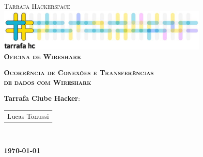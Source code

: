 \begin{titlepage}
\begin{center}

\textsc{\large Tarrafa Hackerspace}\\[1cm]

\includegraphics[width=0.8\textwidth]{../logo}\\[1.5cm]

\textsc{\LARGE \bfseries Oficina de Wireshark\\ [1.3cm]}

\textsc{\LARGE \bfseries Ocorrência de Conexões e Transferências \\ de dados com Wireshark \\ [2cm]}


\begin{Large}
\textbf{Tarrafa Clube Hacker}:
\begin{tabular}{|l}
Lucas Tonussi \\
\end{tabular} \\ [0.5cm]
\end{Large}

\vfill

\textbf{\today}

\end{center}
\end{titlepage}
